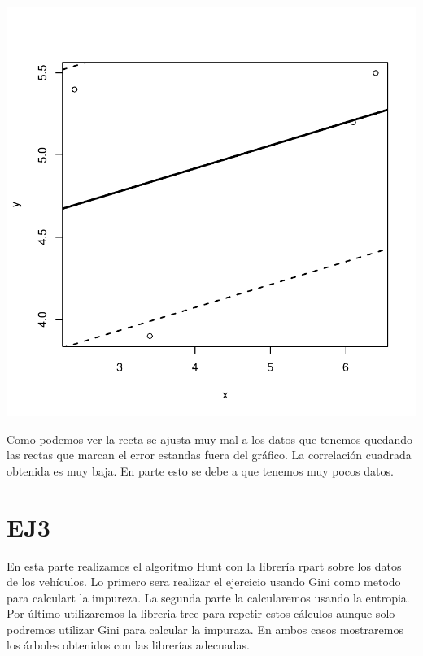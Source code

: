 \documentclass [a4paper] {article}
\begin{document}
\includegraphics{entrega2-plot_regresion2}

Como podemos ver la recta se ajusta muy mal a los datos que tenemos quedando las rectas que marcan el error estandas fuera del gráfico.
La correlación cuadrada obtenida es muy baja.
En parte esto se debe a que tenemos muy pocos datos.


\section{EJ3}

En esta parte realizamos el algoritmo Hunt con la librería rpart sobre los datos de los vehículos.
Lo primero sera realizar el ejercicio usando Gini como metodo para calculart la impureza.
La segunda parte la calcularemos usando la entropia. 
Por último utilizaremos la libreria tree para repetir estos cálculos aunque solo podremos utilizar Gini para calcular la impuraza.
En ambos casos mostraremos los árboles obtenidos con las librerías adecuadas.
\end{document}
